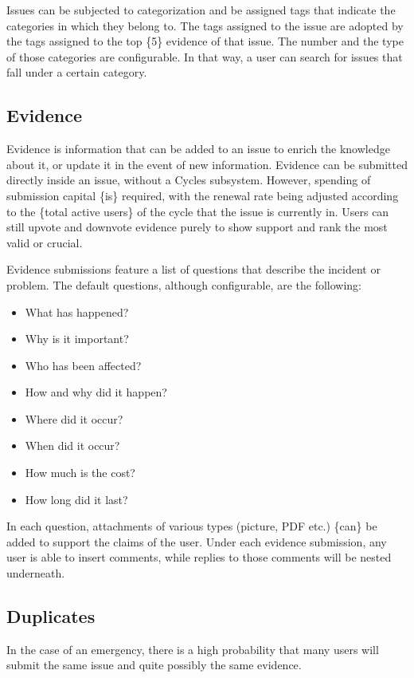 \documentclass[a4paper,11pt]{article}
\begin{document}
\begin{multicols}{2}
Issues can be subjected to categorization and be assigned tags that indicate the categories in which they belong to. The tags assigned to the issue are adopted by the tags assigned to the top \{5\} evidence of that issue. The number and the type of those categories are configurable. In that way, a user can search for issues that fall under a certain category.

\subsection{Evidence} \label{evidence}

Evidence is information that can be added to an issue to enrich the knowledge about it, or update it in the event of new information. Evidence can be submitted directly inside an issue, without a Cycles subsystem. However, spending of submission capital \{is\} required, with the renewal rate being adjusted according to the \{total active users\} of the cycle that the issue is currently in. Users can still upvote and downvote evidence purely to show support and rank the most valid or crucial.

Evidence submissions feature a list of questions that describe the incident or problem. The default questions, although configurable, are the following:

\begin{itemize}
\item What has happened?
\item Why is it important?
\item Who has been affected?
\item How and why did it happen?
\item Where did it occur?
\item When did it occur?
\item How much is the cost?
\item How long did it last?
\end{itemize}

In each question, attachments of various types (picture, PDF etc.) \{can\} be added to support the claims of the user. Under each evidence submission, any user is able to insert comments, while replies to those comments will be nested underneath.

\subsection{Duplicates} \label{duplicates}

In the case of an emergency, there is a high probability that many users will submit the same issue and quite possibly the same evidence.


\end{multicols}
\end{document}
